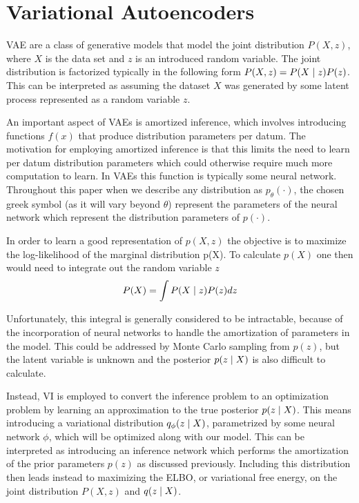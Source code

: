 \section{Variational Autoencoders}

\ac{VAE} are a class of generative models that model the joint distribution $P(X, z)$, where $X$ is the data set and $z$ is an introduced random variable. The joint distribution is factorized typically in the following form $P(X, z) = P(X\; | \;{z})P(z)$. This can be interpreted as assuming the dataset $X$ was generated by some latent process represented as a random variable $z$. 

An important aspect of \ac{VAE}s is amortized inference, which involves introducing functions $f(x)$ that produce distribution parameters per datum. The motivation for employing amortized inference is that this limits the need to learn per datum distribution parameters which could otherwise require much more computation to learn. In \ac{VAE}s this function is typically some neural network. Throughout this paper when we describe any distribution as $p_{\theta}(\cdot)$, the chosen greek symbol (as it will vary beyond $\theta$) represent the parameters of the neural network which represent the distribution parameters of $p(\cdot)$. 

In order to learn a good representation of $p(X,z)$ the objective is to maximize the log-likelihood of the marginal distribution p(X). To calculate $p(X)$ one then would need to integrate out the random variable $z$
\begin{equation}
P(X) = \int P(X \; | \;{z}) P(z) dz
\end{equation}

Unfortunately, this integral is generally considered to be intractable, because of the incorporation of neural networks to handle the amortization of parameters in the model. This could be addressed by Monte Carlo sampling from $p(z)$, but the latent variable is unknown and the posterior $p(z \; | \;{X})$ is also difficult to calculate. 

Instead, \ac{VI} is employed to convert the inference problem to an optimization problem by learning an approximation to the true posterior $p(z \; | \;{X})$. This means introducing a variational distribution $q_{\phi}(z \; | \;{X})$, parametrized by some neural network $\phi$, which will be optimized along with our model. This can be interpreted as introducing an inference network which performs the amortization of the prior parameters $p(z)$ as discussed previously.  Including this distribution then leads instead to maximizing the \ac{ELBO}, or variational free energy, on the joint distribution $P(X, z)$ and $q(z \; | \;{X})$. 

